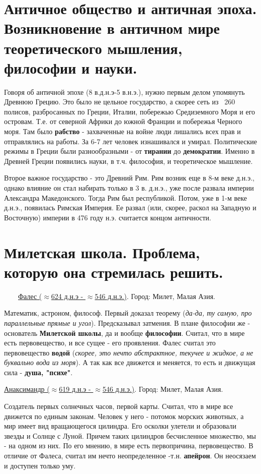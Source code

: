 \documentclass[12pt,a4paper]{article}
\begin{document}
\section{Античное общество и античная эпоха. Возникновение в античном мире теоретического мышления, философии и науки.}
Говоря об античной эпохе (8 в.д.н.э-5 в.н.э.), нужно первым делом упомянуть Древнюю Грецию. Это было не цельное государство, а скорее сеть из ~260 полисов, разбросанных по Греции, Италии, побережью Средиземного Моря и его островам. Т.е. от северной Африки до южной Франции и побережья Черного моря. Там было \textbf{рабство} - захваченные на войне люди лишались всех прав и отправлялись на работы. За 6-7 лет человек изнашивался и умирал.  Политические режимы в Греции были разнообразными - от \textbf{тирании} до \textbf{демократии}. Именно в Древней Греции появились науки, в т.ч. философия, и теоретическое мышление.

Второе важное государство - это Древний Рим. Рим возник еще в 8-м веке д.н.э., однако влияние он стал набирать только в 3 в. д.н.э., уже после развала империи Александра Македонского. Тогда Рим был республикой. Потом, уже в 1-м веке д.н.э., появилась Римская Империя. Ее развал (или, скорее, раскол на Западную и Восточную) империи в 476 году н.э. считается концом античности.

\section{Милетская школа. Проблема, которую она стремилась решить.}
\ \ \ \
\underline{Фалес ($\approx$624 д.н.э - $\approx$546 д.н.э.)}. Город: Милет, Малая Азия.

Математик, астроном, философ. Первый доказал теорему (\textit{да-да, ту самую, про параллельные прямые и угол}). Предсказывал затмения. В плане философии же - основатель \textbf{Милетской школы}, да и вообще \textbf{философии}. Считал, что в мире есть первовещество, и все сущее - его проявления. Фалес считал это первовещество \textbf{водой} (\textit{скорее, это нечто абстрактное, текучее и жидкое, а не буквально вода из моря}). А так как все движется и меняется, то есть и движущая сила - \textbf{душа, "психе"}.

\underline{Анаксимандр ($\approx$619 д.н.э - $\approx$546 д.н.э.)}. Город: Милет, Малая Азия.

Создатель первых солнечных часов, первой карты.
Считал, что в мире все движется по единым законам. Человек у него - потомок морских животных, а мир имеет вид вращающегося цилиндра. Его осколки улетели и образовали звезды и Солнце с Луной. Причем таких цилиндров бесчисленное множество, мы - на одном из них.
По его мнению, в мире есть первопричина, первовещество. В отличие от Фалеса, считал им нечто неопределенное -т.н. \textbf{апейрон}. Он неосязаем и доступен только уму.
\end{document}
